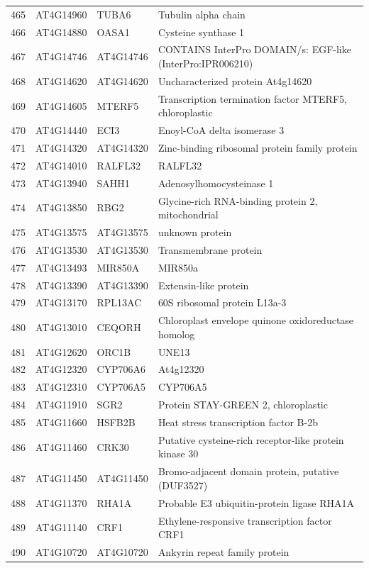 \documentclass[11pt]{article}
\begin{document}
\begin{center}
\begin{tabular}{rlll}
465 & AT4G14960 & TUBA6 & Tubulin alpha chain\\
466 & AT4G14880 & OASA1 & Cysteine synthase 1\\
467 & AT4G14746 & AT4G14746 & CONTAINS InterPro DOMAIN/s: EGF-like (InterPro:IPR006210)\\
468 & AT4G14620 & AT4G14620 & Uncharacterized protein At4g14620\\
469 & AT4G14605 & MTERF5 & Transcription termination factor MTERF5, chloroplastic\\
470 & AT4G14440 & ECI3 & Enoyl-CoA delta isomerase 3\\
471 & AT4G14320 & AT4G14320 & Zinc-binding ribosomal protein family protein\\
472 & AT4G14010 & RALFL32 & RALFL32\\
473 & AT4G13940 & SAHH1 & Adenosylhomocysteinase 1\\
474 & AT4G13850 & RBG2 & Glycine-rich RNA-binding protein 2, mitochondrial\\
475 & AT4G13575 & AT4G13575 & unknown protein\\
476 & AT4G13530 & AT4G13530 & Transmembrane protein\\
477 & AT4G13493 & MIR850A & MIR850a\\
478 & AT4G13390 & AT4G13390 & Extensin-like protein\\
479 & AT4G13170 & RPL13AC & 60S ribosomal protein L13a-3\\
480 & AT4G13010 & CEQORH & Chloroplast envelope quinone oxidoreductase homolog\\
481 & AT4G12620 & ORC1B & UNE13\\
482 & AT4G12320 & CYP706A6 & At4g12320\\
483 & AT4G12310 & CYP706A5 & CYP706A5\\
484 & AT4G11910 & SGR2 & Protein STAY-GREEN 2, chloroplastic\\
485 & AT4G11660 & HSFB2B & Heat stress transcription factor B-2b\\
486 & AT4G11460 & CRK30 & Putative cysteine-rich receptor-like protein kinase 30\\
487 & AT4G11450 & AT4G11450 & Bromo-adjacent domain protein, putative (DUF3527)\\
488 & AT4G11370 & RHA1A & Probable E3 ubiquitin-protein ligase RHA1A\\
489 & AT4G11140 & CRF1 & Ethylene-responsive transcription factor CRF1\\
490 & AT4G10720 & AT4G10720 & Ankyrin repeat family protein\\

\end{tabular}
\end{center}
\end{document}

